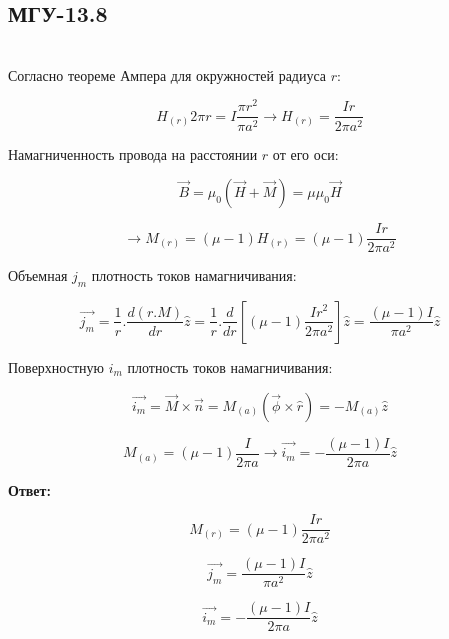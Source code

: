 \subsection*{МГУ-13.8}
\setcounter{equation}{0}

\begin{abstract}
Длинный прямолинейный провод радиусом $а$ из проводящего материала с магнитной проницаемостью $\mu$ находится в воздухе. По проводу течет постоянный ток $I$, равномерно распределенный по его сечению. Найти намагниченность $М$ провода на расстоянии $r$ от его оси, объемную $j_m$ и поверхностную $i_m$ плотность токов намагничивания.
\end{abstract}

\noindent \hrulefill
\\

Согласно теореме Ампера для окружностей радиуса $r$:

$$H_{(r)}2 \pi r = I \frac{\pi r^2}{\pi a^2} \xrightarrow[]{} H_{(r)} = \frac{Ir}{2 \pi a^2}$$

Намагниченность провода на расстоянии $r$ от его оси: 

$$\vec{B} = \mu_0 (\vec{H} + \vec{M}) = \mu \mu_0 \vec{H}$$

$$ \xrightarrow[]{} M_{(r)} = (\mu -1) H_{(r)} = (\mu -1) \frac{Ir}{2 \pi a^2} $$

Объемная $j_m$ плотность токов намагничивания:

$$\vec{j_m} = \frac{1}{r}.\frac{d(r.M)}{dr} \hat{z} = \frac{1}{r}.\frac{d}{dr} [(\mu -1) \frac{Ir^2}{2 \pi a^2}] \hat{z} = \frac{(\mu - 1) I}{\pi a^2} \hat{z}$$

Поверхностную $i_m$ плотность токов намагничивания:

$$\vec{i_m} = \vec{M} \times \vec{n} = M_{(a)}(\vec{\phi} \times \hat{r}) = -M_{(a)} \hat{z}$$

$$M_{(a)} = (\mu -1) \frac{I}{2 \pi a} \xrightarrow[]{} \vec{i_m} = - \frac{(\mu -1)I}{2 \pi a} \hat{z}$$

\textbf{Ответ:}

$$ M_{(r)} = (\mu -1) \frac{Ir}{2 \pi a^2}$$

$$\vec{j_m} = \frac{(\mu - 1) I}{\pi a^2} \hat{z}$$

$$\vec{i_m} = - \frac{(\mu -1)I}{2 \pi a} \hat{z}$$







